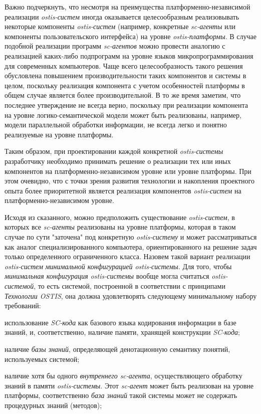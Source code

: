 Важно подчеркнуть, что несмотря на преимущества платформенно-независимой реализации \textit{ostis-систем} иногда оказывается целесообразным реализовывать некоторые компоненты \textit{ostis-систем} (например, конкретные \textit{sc-агенты} или компоненты пользовательского интерфейса) на уровне \textit{ostis-платформы}. В случае подобной реализации программ \textit{sc-агентов} можно провести аналогию с реализацией каких-либо подпрограмм на уровне языков микропрограммирования для современных компьютеров. Чаще всего целесообразность такого решения обусловлена повышением производительности таких компонентов и системы в целом, поскольку реализация компонента с учетом особенностей платформы в общем случае является более производительной. В то же время заметим, что последнее утверждение не всегда верно, поскольку при реализации компонента на уровне логико-семантической модели может быть реализованы, например, модели параллельной обработки информации, не всегда легко и понятно реализуемые на уровне платформы.

Таким образом, при проектировании каждой конкретной \textit{ostis-системы} разработчику необходимо принимать решение о реализации тех или иных компонентов на платформенно-независимом уровне или уровне платформы. При этом очевидно, что с точки зрения развития технологии и накопления проектного опыта более приоритетной является реализация компонентов \textit{ostis-систем} на платформенно-независимом уровне.

Исходя из сказанного, можно предположить существование \textit{ostis-систем}, в которых все \textit{sc-агенты} реализованы на уровне платформы, которая в таком случае по сути "заточена"{} под конкретную \textit{ostis-систему} и может рассматриваться как аналог специализированного компьютера, ориентированного на решение задач только определенного ограниченного класса. Назовем такой вариант реализации \textit{ostis-систем} \textit{минимальной конфигурацией ostis-системы}. Для того, чтобы \textit{минимальная конфигурация ostis-системы} вообще могла считаться \textit{ostis-системой}, то есть системой, построенной в соответствии с принципами \textit{Технологии OSTIS}, она должна удовлетворять следующему минимальному набору требований:
\begin{textitemize}
	\item использование \textit{SC-кода} как базового языка кодирования информации в базе знаний, и, соответственно, наличие памяти, хранящей конструкции \textit{SC-кода};
	\item наличие \textit{базы знаний}, определяющей денотационную семантику понятий, используемых системой;
	\item наличие хотя бы одного \textit{внутреннего sc-агента}, осуществляющего обработку знаний в памяти \textit{ostis-системы}. Этот \textit{sc-агент} может быть реализован на уровне платформы, соответственно \textit{база знаний} такой системы может не содержать процедурных знаний (методов);
\end{textitemize}

